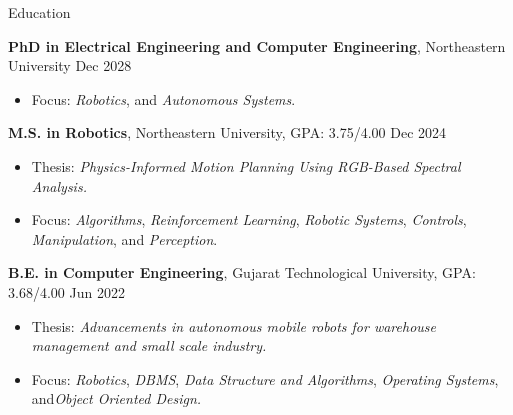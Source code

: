 \documentclass{resume}
\newcommand{\smallspace}{\hspace{0.2em}}
\begin{document}
\fancyheadoffset[RO]{5em}
\fancyfootoffset[RO]{0cm}
\thispagestyle{firstpage}
\vspace{-10pt}
\begin{rSection}{Education}

{\textbf {PhD in Electrical Engineering and Computer Engineering}}, Northeastern University \hfill {Dec 2028} 
 
\begin{itemize}
  \item[] \vspace{-0.5em} \hspace{-1.0em} Focus: \emph{Robotics}, and \smallspace \emph{Autonomous Systems}.
\end{itemize}

{\textbf {M.S. in Robotics}}, Northeastern University, GPA: 3.75/4.00 \hfill {Dec 2024} 
 
\begin{itemize}
  \item[] \vspace{-0.5em} \hspace{-1.0em} Thesis: \emph{Physics-Informed Motion Planning Using RGB-Based Spectral Analysis.}
  \item[] \vspace{-0.5em} \hspace{-1.0em} Focus: \emph{Algorithms}, \smallspace \emph{Reinforcement Learning}, \smallspace \emph{Robotic Systems}, \smallspace \emph{Controls}, \smallspace \emph{Manipulation}, \smallspace and \smallspace \emph{Perception}.
\end{itemize}


{\bf B.E. in Computer Engineering}, Gujarat Technological University, GPA: 3.68/4.00 \hfill {Jun 2022} 
\begin{itemize}
    \item[] \vspace{-0.5em} \hspace{-1.0em} Thesis: \emph{Advancements in autonomous mobile robots for warehouse management and small scale industry.}
    \item[] \vspace{-0.5em} \hspace{-1.0em} Focus: \emph{Robotics}, \smallspace \emph{DBMS}, \smallspace \emph{Data Structure and Algorithms}, \smallspace \emph{Operating Systems}, \smallspace and\smallspace \emph{Object Oriented Design.}
\end{itemize}
\end{rSection}
\end{document}
